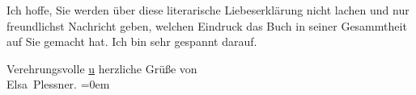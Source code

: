 \pstart
           Ich hoffe, Sie werden über diese literarische Liebeserklärung nicht lachen und nur
               freundlichst Nachricht geben, welchen Eindruck das Buch in seiner Gesammtheit auf Sie gemacht hat. Ich bin
               sehr gespannt darauf.\pend
           
\pstart
           Verehrungsvolle \uline{u} herzliche Grüße von{\\[\baselineskip]}\spacefill\mbox{Elsa Plessner.}\pend
           \leftskip=0em{}\endnumbering{}  \newcommand{\dateiname}{L03727}\newcommand{\titel}{Elsa Plessner an Arthur Schnitzler, 8. 10. 1900}\newcommand{\editorInnen}{Selma Jahnke und Martin Anton Müller}
